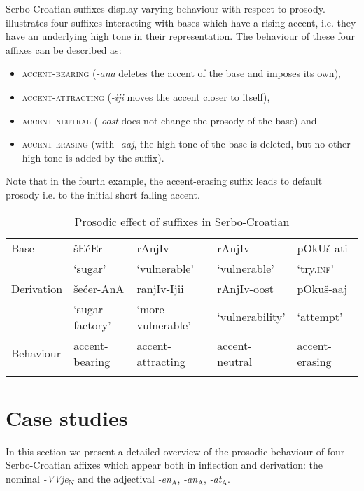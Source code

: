 \documentclass[output=paper]{langsci/langscibook}
\begin{document}
Serbo-Croatian suffixes display varying behaviour with respect to prosody.  illustrates four suffixes interacting with bases which have a rising accent, i.e. they have an underlying high tone in their representation. The behaviour of these four affixes can be described as:\begin{itemize}
  \item \textsc{accent-bearing} (\textit{-ana} deletes the accent of the base and imposes its own),
  \item \textsc{accent-attracting} (\textit{-iji} moves the accent closer to itself),
  \item \textsc{accent-neutral} (\textit{-oost} does not change the prosody of the base) and 
  \item \textsc{accent-erasing} (with \textit{-aaj}, the high tone of the base is deleted, but no other high tone is added by the suffix). 
  \end{itemize}
Note that in the fourth example, the accent-erasing suffix leads to default prosody i.e. to the initial short falling accent. 

\begin{table}
\small
\caption{Prosodic effect of suffixes in Serbo-Croatian}
\label{tab2}
 \begin{tabular}{l l l l l }
\lsptoprule
Base  & šEćEr  & rAnjIv  & rAnjIv  & pOkUš-ati  \\ 
& `sugar' & `vulnerable' & `vulnerable' & `try.\textsc{inf}'\smallskip \\
Derivation & šećer-AnA   & ranjIv-Ijii  & rAnjIv-oost  & pOkuš-aaj   \\
 &  `sugar factory' & `more vulnerable' & `vulnerability' & `attempt'\smallskip  \\
Behaviour   & accent-bearing & accent-attracting & accent-neutral & accent-erasing \\
 \lspbottomrule
 \end{tabular}
\end{table}

\section{Case studies} \label{sec:simonovic:4}

In this section we present a detailed overview of the prosodic behaviour of four Serbo-Croatian affixes which appear both in inflection and derivation: the nominal \textit{-VVje}\textsubscript{N}  and the adjectival \textit{-en}\textsubscript{A}, \textit{-an}\textsubscript{A}, \textit{-at}\textsubscript{A}. 
\end{document}
